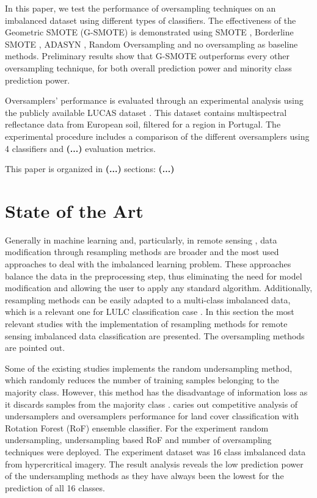 \documentclass[parskip=full]{scrartcl}
\begin{document}
In this paper, we test the performance of oversampling techniques on an
imbalanced dataset using different types of classifiers. The effectiveness of
the Geometric SMOTE (G-SMOTE) \cite{Douzas2019} is demonstrated using SMOTE
\cite{Chawla2002}, Borderline SMOTE \cite{Han2005}, ADASYN \cite{HaiboHe2008},
Random Oversampling and no oversampling as baseline methods. Preliminary results
show that G-SMOTE outperforms every other oversampling technique, for both
overall prediction power and minority class prediction power.

Oversamplers' performance is evaluated through an experimental analysis using
the publicly available LUCAS dataset \cite{Toth2013}. This dataset contains
multispectral reflectance data from European soil, filtered for a region in
Portugal. The experimental procedure includes a comparison of the different
oversamplers using 4 classifiers and \textbf{(...)} evaluation metrics.

This paper is organized in \textbf{(...)} sections: \textbf{(...)}

\section{State of the Art}

Generally in machine learning \cite{Douzas2019} and, particularly, in
remote sensing \cite{Feng2019}, data modification through resampling methods
are broader and the most used approaches to deal with the imbalanced learning
problem. These approaches balance the data in the preprocessing step, thus
eliminating the need for model modification and allowing the user to apply any
standard algorithm. Additionally, resampling methods can be easily adapted to a
multi-class imbalanced data, which is a relevant one for LULC classification
case \cite{Feng2019}. In this section the most relevant studies with the
implementation of resampling methods for remote sensing imbalanced data
classification are presented. The oversampling methods are pointed out.

Some of the existing studies implements the random undersampling method,
which randomly reduces the number of training samples  belonging to the
majority class. However, this method has the disadvantage of information loss
as it discards samples from the majority class  \cite{Feng2019}.
\cite{Feng2018} caries out competitive analysis of  undersamplers and
oversamplers performance for land cover classification with  Rotation Forest
(RoF) ensemble classifier. For the experiment random  undersampling,
undersampling based RoF and number of oversampling techniques  were deployed.
The experiment dataset was 16 class imbalanced data from  hypercritical
imagery. The result analysis reveals the low prediction power of the
undersampling methods as they have always been the lowest for the prediction of
all 16 classes.
\end{document}
